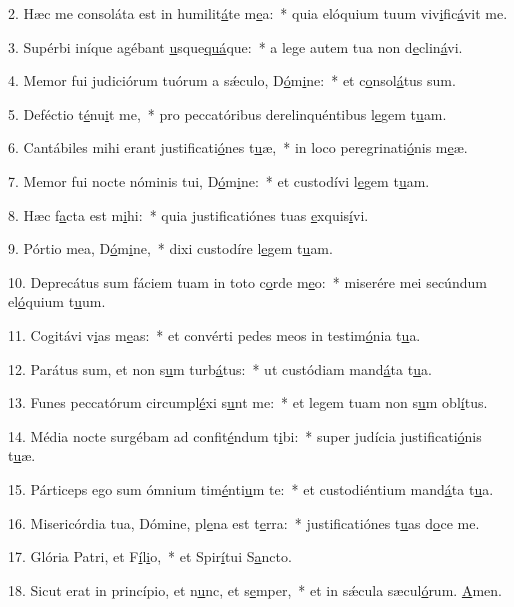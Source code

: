 2. Hæc me consoláta est in humilit\uline{á}te m\uline{e}a:~* quia elóquium tuum viv\uline{i}fic\uline{á}vit me.\par 
3. Supérbi iníque agébant \uline{u}sque\uline{quá}que:~* a lege autem tua non d\uline{e}clin\uline{á}vi.\par 
4. Memor fui judiciórum tuórum a sǽculo, D\uline{ó}m\uline{i}ne:~* et c\uline{o}nsol\uline{á}tus sum.\par 
5. Deféctio t\uline{é}nu\uline{i}t me,~* pro peccatóribus derelinquéntibus l\uline{e}gem t\uline{u}am.\par 
6. Cantábiles mihi erant justificati\uline{ó}nes t\uline{u}æ,~* in loco peregrinati\uline{ó}nis m\uline{e}æ.\par 
7. Memor fui nocte nóminis tui, D\uline{ó}m\uline{i}ne:~* et custodívi l\uline{e}gem t\uline{u}am.\par 
8. Hæc f\uline{a}cta est m\uline{i}hi:~* quia justificatiónes tuas \uline{e}xquis\uline{í}vi.\par 
9. Pórtio mea, D\uline{ó}m\uline{i}ne,~* dixi custodíre l\uline{e}gem t\uline{u}am.\par 
10. Deprecátus sum fáciem tuam in toto c\uline{o}rde m\uline{e}o:~* miserére mei secúndum el\uline{ó}quium t\uline{u}um.\par 
11. Cogitávi v\uline{i}as m\uline{e}as:~* et convérti pedes meos in testim\uline{ó}nia t\uline{u}a.\par 
12. Parátus sum, et non s\uline{u}m turb\uline{á}tus:~* ut custódiam mand\uline{á}ta t\uline{u}a.\par 
13. Funes peccatórum circumpl\uline{é}xi s\uline{u}nt me:~* et legem tuam non s\uline{u}m obl\uline{í}tus.\par 
14. Média nocte surgébam ad confit\uline{é}ndum t\uline{i}bi:~* super judícia justificati\uline{ó}nis t\uline{u}æ.\par 
15. Párticeps ego sum ómnium tim\uline{é}nti\uline{u}m te:~* et custodiéntium mand\uline{á}ta t\uline{u}a.\par 
16. Misericórdia tua, Dómine, pl\uline{e}na est t\uline{e}rra:~* justificatiónes t\uline{u}as d\uline{o}ce me.\par 
17. Glória Patri, et F\uline{í}l\uline{i}o,~* et Spir\uline{í}tui S\uline{a}ncto.\par 
18. Sicut erat in princípio, et n\uline{u}nc, et s\uline{e}mper,~* et in sǽcula sæcul\uline{ó}rum. \uline{A}men.\par 
